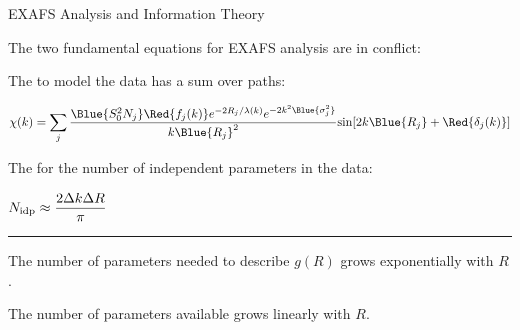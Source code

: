 
\begin{slide}{EXAFS Analysis and Information Theory}

  The two fundamental equations for EXAFS analysis are in conflict:

  \vmm \vmm \vmm

  The {} to model the  data has a sum over paths:
  \begin{center}
    $\displaystyle   \chi(k) = \sum_j{ 
        \frac{ {\Blue{S_0^2 N_j}}{\Red{f_j(k)}} 
          e^{-2R_j/\lambda(k)}   e^{-2k^2{\Blue{\sigma_j^2}}}
        }{ k{\Blue{R_j}}^2    }
             {\sin[{2k{\Blue{R_j}} +
                   {\Red{\delta_j(k)}}} 
             ]}
      }
      $
  \end{center}

  \vmm 
  The {} for the number of independent parameters
  in the data: 
  \begin{center}
    $ \displaystyle N_{\rm idp} \approx \frac{2\Delta k\Delta R}{\pi} $
  \end{center}

\pause\hrule \vmm

The number of parameters needed to describe $g(R)$ grows exponentially with $R$.

\vmm

The number of parameters available grows linearly with $R$. \par


\vfill 
\end{slide}

